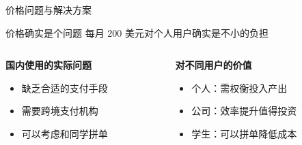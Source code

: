 \documentclass[aspectratio=169,xcolor=dvipsnames]{beamer}
\begin{document}
\begin{frame}{价格问题与解决方案}
  \begin{alertblock}{价格确实是个问题}
    每月 200 美元对个人用户确实是不小的负担
  \end{alertblock}

  \vspace{0.3cm}

  \begin{columns}
    \begin{column}{0.48\textwidth}
      \textbf{国内使用的实际问题}
      \begin{itemize}
        \item 缺乏合适的支付手段
        \item 需要跨境支付机构
        \item 可以考虑和同学拼单
      \end{itemize}
    \end{column}
    \begin{column}{0.48\textwidth}
      \textbf{对不同用户的价值}
      \begin{itemize}
        \item 个人：需权衡投入产出
        \item 公司：效率提升值得投资
        \item 学生：可以拼单降低成本
      \end{itemize}
    \end{column}
  \end{columns}
\end{frame}
\end{document}
